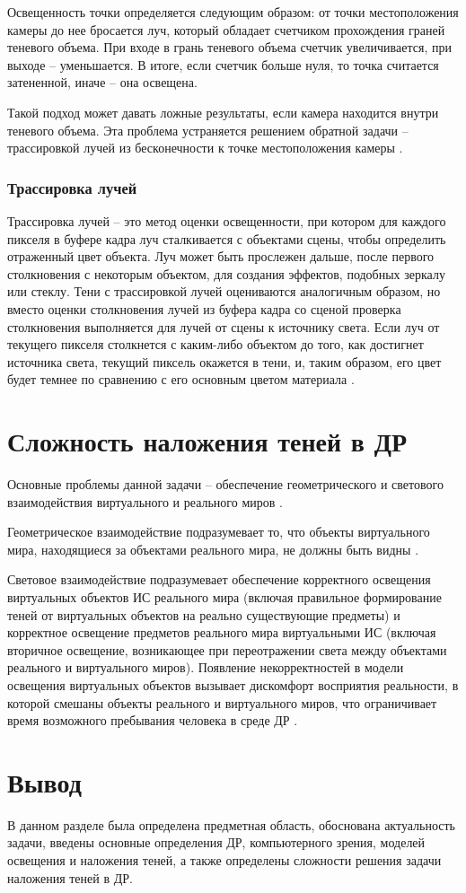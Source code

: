 Освещенность точки определяется следующим образом: от точки местоположения камеры до нее бросается луч, который обладает счетчиком прохождения граней теневого объема. При входе в грань теневого объема счетчик увеличивается, при выходе -- уменьшается. В итоге, если счетчик больше нуля, то точка считается затененной, иначе -- она освещена.

Такой подход может давать ложные результаты, если камера находится внутри теневого объема. Эта проблема устраняется решением обратной задачи -- трассировкой лучей из бесконечности к точке местоположения камеры \cite{shad_vol}.

\subsubsection*{Трассировка лучей}

Трассировка лучей -- это метод оценки освещенности, при котором для каждого пикселя в буфере кадра луч сталкивается с объектами сцены, чтобы определить отраженный цвет объекта. Луч может быть прослежен дальше, после первого столкновения с некоторым объектом, для создания эффектов, подобных зеркалу или стеклу. Тени с трассировкой лучей оцениваются аналогичным образом, но вместо оценки столкновения лучей из буфера кадра со сценой проверка столкновения выполняется для лучей от сцены к источнику света. Если луч от текущего пикселя столкнется с каким-либо объектом до того, как достигнет источника света, текущий пиксель окажется в тени, и, таким образом, его цвет будет темнее по сравнению с его основным цветом материала \cite{engel2008programming}.

\section{Сложность наложения теней в ДР}

Основные проблемы данной задачи -- обеспечение геометрического и светового взаимодействия виртуального и реального миров \cite{sns_tras}.

Геометрическое взаимодействие подразумевает то, что объекты виртуального мира, находящиеся за объектами реального мира, не должны быть видны \cite{sns_tras}.

Световое взаимодействие подразумевает обеспечение корректного освещения виртуальных объектов ИС реального мира (включая правильное формирование теней от виртуальных объектов на реально существующие предметы) и корректное освещение предметов реального мира виртуальными ИС (включая вторичное освещение, возникающее при переотражении света между объектами реального и виртуального миров). Появление некорректностей в модели освещения виртуальных объектов вызывает дискомфорт восприятия реальности, в которой смешаны объекты реального и виртуального миров, что ограничивает время возможного пребывания человека в среде ДР \cite{sns_tras}.

\section*{Вывод}

В данном разделе была определена предметная область, обоснована актуальность задачи, введены основные определения ДР, компьютерного зрения, моделей освещения и наложения теней, а также определены сложности решения задачи наложения теней в ДР.